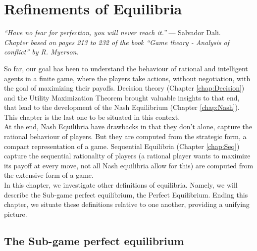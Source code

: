\ifx \globalmark \undefined %

\else 	
\fi



\chapter{Refinements of Equilibria}
\label{chap:Refinements}
{\large{\itshape
``Have no fear for perfection, you will never reach it.''} --- Salvador Dali.\\}
  {\small{\itshape
Chapter based on pages 213 to 232 of the book  ``Game theory - Analysis of conflict'' by R. Myerson.}\\
}

So far, our goal has been to understand the behaviour of rational and intelligent agents in a finite game, where the players take actions, without negotiation, with the goal of maximizing their payoffs. Decision  theory (Chapter \ref{chap:Decision}) and the Utility Maximization Theorem brought  valuable insights to that end, that lead to the development of the Nash Equilibrium (Chapter \ref{chap:Nash}). This chapter is the last one to be situated in this context.\\
At the end, Nash Equilibria have drawbacks in that they don't alone, capture the rational behaviour of players. But they are computed from the strategic form, a compact representation of a game. Sequential Equilibria (Chapter \ref{chap:Seq}) capture the  sequential rationality of players (a rational player wants to maximize its payoff at every move, not all Nash equilibria allow for this) are computed from the extensive form of a game. \\
In this chapter, we investigate other definitions of equilibria. Namely, we will describe the Sub-game perfect equilibrium, the Perfect Equilibrium. Ending this chapter, we situate these definitions relative to one another, providing a unifying picture. 
\section{The Sub-game perfect equilibrium}

